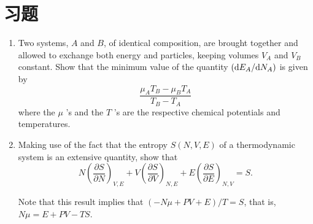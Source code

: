 \section{习题} %
\label{sec:习题1}
\begin{enumerate}
	\item Two systems, $A$ and $B$, of identical composition, are brought together and allowed to exchange both energy and particles, keeping volumes $V_A$ and $V_B$ constant. Show that the minimum value of the quantity $\left(\mathrm{d}  E_A / \mathrm{d} N_A\right)$ is given by
	$$
	\frac{\mu_A T_B-\mu_B T_A}{T_B-T_A}
	$$
	where the $\mu$ 's and the $T$ 's are the respective chemical potentials and temperatures.
	\item Making use of the fact that the entropy $S(N, V, E)$ of a thermodynamic system is an extensive quantity, show that
	$$
	N\left(\frac{\partial S}{\partial N}\right)_{V, E}+V\left(\frac{\partial S}{\partial V}\right)_{N, E}+E\left(\frac{\partial S}{\partial E}\right)_{N, V}=S .
	$$

	Note that this result implies that $(-N \mu+P V+E) / T=S$, that is, $N \mu=E+P V-T S$.

\end{enumerate}
